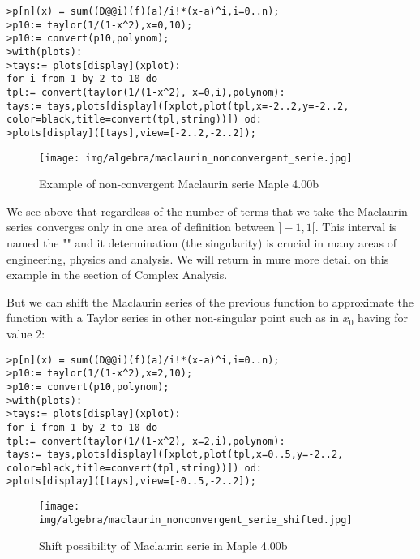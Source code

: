 	
	\texttt{>p[n](x) = sum((D@@i)(f)(a)/i!*(x-a)\string^i,i=0..n); \\
	>p10:= taylor(1/(1-x\string^2),x=0,10);\\
	>p10:= convert(p10,polynom);\\
	>with(plots):\\
	>tays:= plots[display](xplot):\\
	for i from 1 by 2 to 10 do\\
	tpl:= convert(taylor(1/(1-x\string^2), x=0,i),polynom):\\
	tays:= tays,plots[display]([xplot,plot(tpl,x=-2..2,y=-2..2,
	color=black,title=convert(tpl,string))]) od: \\
	>plots[display]([tays],view=[-2..2,-2..2]);}
	\begin{figure}[H]
		\centering
		\texttt{[image: img/algebra/maclaurin\_nonconvergent\_serie.jpg]}
		\caption{Example of non-convergent Maclaurin serie Maple 4.00b}
	\end{figure}
	We see above that regardless of the number of terms that we take the Maclaurin series converges only in one area of definition between $] -1,1 [$. This interval is named the "" and it determination (the singularity) is crucial in many areas of engineering, physics and analysis. We will return in mure more detail on this example in the section of Complex Analysis.
	
	But we can shift the Maclaurin series of the previous function to approximate the function with a Taylor series in other non-singular point such as in $x_0$ having for value $2$:
	
	\texttt{>p[n](x) = sum((D@@i)(f)(a)/i!*(x-a)\string^i,i=0..n);\\
	>p10:= taylor(1/(1-x\string^2),x=2,10);\\
	>p10:= convert(p10,polynom);\\
	>with(plots):\\
	>tays:= plots[display](xplot):\\
	for i from 1 by 2 to 10 do\\
	tpl:= convert(taylor(1/(1-x\string^2), x=2,i),polynom):\\
	tays:= tays,plots[display]([xplot,plot(tpl,x=0..5,y=-2..2,\\
	color=black,title=convert(tpl,string))]) od: \\
	>plots[display]([tays],view=[-0..5,-2..2]);}
	
	\begin{figure}[H]
		\centering
		\texttt{[image: img/algebra/maclaurin\_nonconvergent\_serie\_shifted.jpg]}
		\caption{Shift possibility of Maclaurin serie in Maple 4.00b}
	\end{figure}
	
